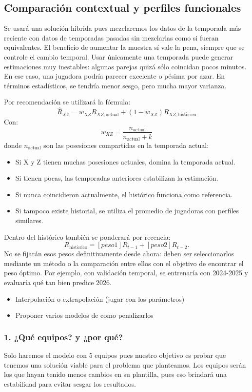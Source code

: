 \subsection{Comparación contextual y perfiles funcionales}
Se usará una solución hibrida pues mezclaremos los datos de la temporada más reciente con datos de temporadas pasadas sin mezclarlas como si fueran equivalentes. El beneficio de aumentar la muestra sí vale la pena, siempre que se controle el cambio temporal. Usar únicamente una temporada puede generar estimaciones muy inestables: algunas parejas quizá sólo coincidan pocos minutos. En ese caso, una jugadora podría parecer excelente o pésima por azar. En términos estadísticos, se tendría menor sesgo, pero mucha mayor varianza.

Por recomendación se utilizará la fórmula:
\[
\widehat R_{XZ}=w_{XZ}R_{XZ,\mathrm{actual}}+(1-w_{XZ})R_{XZ,\mathrm{hist\acute orico}}
\]
Con:
\[
w_{XZ}=\frac{n_{\mathrm{actual}}}{n_{\mathrm{actual}}+k}
\]
donde $n_{\mathrm{actual}}$ son las posesiones compartidas en la temporada actual:
\begin{itemize}
\item Si X y Z tienen muchas posesiones actuales, domina la temporada actual.
\item Si tienen pocas, las temporadas anteriores estabilizan la estimación.
\item Si nunca coincidieron actualmente, el histórico funciona como referencia.
\item Si tampoco existe historial, se utiliza el promedio de jugadoras con perfiles similares.
\end{itemize}

Dentro del histórico también se ponderará por recencia:
\[
R_{\mathrm{hist\acute orico}}=[peso1]R_{t-1}+[peso2]R_{t-2}.
\]
No se fijarán esos pesos definitivamente desde ahora: deben ser seleccionarlos mediante un método o la comparación entre ellos con el objetivo de encontrar el peso óptimo. Por ejemplo, con validación temporal, se entrenaría con 2024-2025 y evaluaría qué tan bien predice 2026.
\begin{itemize}
\item Interpolación o extrapolación (jugar con los parámetros)
\item Proponer varios modelos de como penalizarlos
\end{itemize}

\subsubsection*{1. ¿Qué equipos? y ¿por qué?}
Solo haremos el modelo con 5 equipos pues nuestro objetivo es probar que tenemos una solución viable para el problema que planteamos. Los equipos serán los que hayan tenido menos cambios en su plantilla, pues eso brindará una estabilidad para evitar sesgar los resultados.

